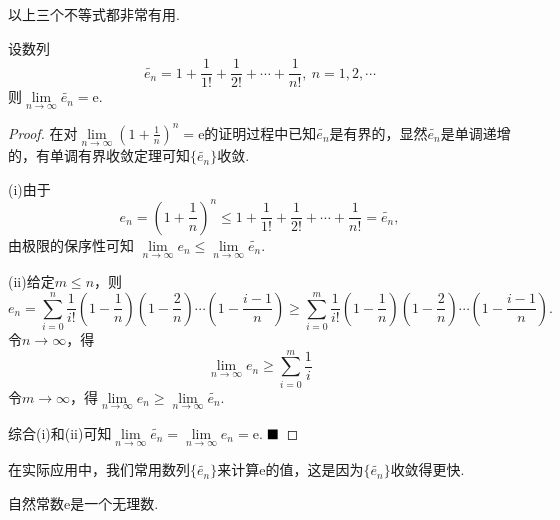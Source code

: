 以上三个不等式都非常有用.
\begin{proposition}
	设数列$$\widetilde{e_n}=1+\frac{1}{1!}+\frac{1}{2!}+\cdots+\frac{1}{n!},\ n=1,2,\cdots$$
	则$\lim\limits_{n\to\infty}\widetilde{e_n}=\text{e}.$
\end{proposition}
\begin{proof}
	在对$\lim\limits_{n\to\infty}(1+\frac{1}{n})^n=\text{e}$的证明过程中已知$\widetilde{e_n}$是有界的，显然$\widetilde{e_n}$是单调递增的，有单调有界收敛定理可知$\{\widetilde{e_n}\}$收敛.
	
	(i)由于
	$$e_n=(1+\frac{1}{n})^n\leqslant1+\frac{1}{1!}+\frac{1}{2!}+\cdots+\frac{1}{n!}=\widetilde{e_n},$$
	由极限的保序性可知
	$\lim\limits_{n\to\infty}e_n\leqslant\lim\limits_{n\to\infty}\widetilde{e_n}.$
	
	(ii)给定$m\leqslant n$，则
	$$e_n=\sum_{i=0}^{n}\frac{1}{i!}(1-\frac{1}{n})(1-\frac{2}{n})\cdots(1-\frac{i-1}{n})\geqslant\sum_{i=0}^{m}\frac{1}{i!}(1-\frac{1}{n})(1-\frac{2}{n})\cdots(1-\frac{i-1}{n}).$$
	令$n\to\infty$，得
	$$\lim\limits_{n\to \infty}e_n\geqslant\sum_{i=0}^{m}\frac{1}{i}$$
	令$m\to\infty$，得$\lim\limits_{n\to\infty}e_n\geqslant\lim\limits_{n\to\infty}\widetilde{e_n}.$
	
	综合(i)和(ii)可知$\lim\limits_{n\to\infty}\widetilde{e_n}=\lim\limits_{n\to\infty}e_n=\text{e}.$
	$\hfill\blacksquare$
\end{proof}
在实际应用中，我们常用数列$\{\widetilde{e_n}\}$来计算e的值，这是因为$\{\widetilde{e_n}\}$收敛得更快.
\begin{theorem}
	自然常数e是一个无理数.
\end{theorem}

